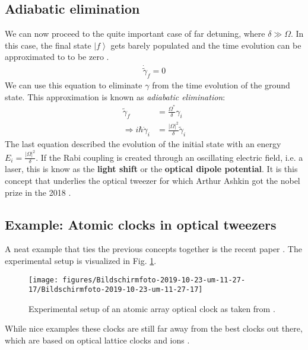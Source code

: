 \documentclass[10pt]{article}
\let\cite\citep
\providecommand\citep{\cite}
\newcommand{\ket}[1]{\ensuremath{\left|#1\right\rangle}}
\begin{document}
\subsection{Adiabatic elimination}

We can now proceed to the quite important case of far detuning, where $\delta \gg \Omega$. In this case, the final state $\ket{f}$ gets barely populated and the time evolution can be approximated to to be zero \cite{lukin}.
\begin{align}
\dot{\tilde{\gamma}}_f = 0
\end{align}
We can use this equation to eliminate $\gamma$ from the time evolution of the ground state. This approximation is known as \textit{adiabatic elimination}:
\begin{align}
\tilde{\gamma}_f &= \frac{\Omega^*}{\delta}\gamma_i\\
\Rightarrow i\hbar \dot{\gamma}_i &= \frac{|\Omega|^2}{\delta} \tilde{\gamma}_i
\end{align}
The last equation described the evolution of the initial state with an energy $E_i = \frac{|\Omega|^2}{\delta}$. If the Rabi coupling is created through an oscillating electric field, i.e. a laser, this is know as the \textbf{light shift} or the \textbf{optical dipole potential}. It is this concept that underlies the optical tweezer for which Arthur Ashkin got the nobel prize in the 2018 \cite{2018}.


\subsection{Example: Atomic clocks in optical tweezers}

A neat example that ties the previous concepts together is the recent paper \cite{readout}. The experimental setup is visualized in Fig. \ref{870855}.
\begin{figure}[h!]
\begin{center}
\texttt{[image: figures/Bildschirmfoto-2019-10-23-um-11-27-17/Bildschirmfoto-2019-10-23-um-11-27-17]}
\caption{{Experimental setup of an atomic array optical clock as taken from
\protect\cite{readout}.
{\label{870855}}%
}}
\end{center}
\end{figure}

While nice examples these clocks are still far away from the best clocks out there, which are based on optical lattice clocks and ions \cite{Ludlow_2015}. 
\end{document}
